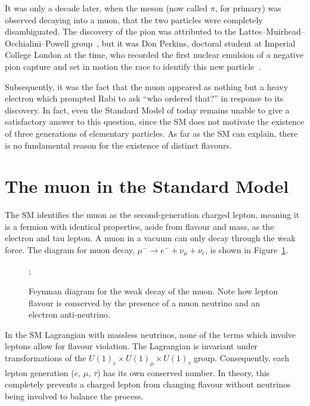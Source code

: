 It was only a decade later, when the meson (now called $\pi$, for primary) was
observed decaying into a muon, that the two particles were completely
disambiguated. The discovery of the pion was attributed to the
Lattes--Muirhead--Occhialini--Powell group~\cite{LATTES1947}, but it was Don
Perkins, doctoral student at Imperial College London at the time, who recorded
the first nuclear emulsion of a negative pion capture and set in motion the race
to identify this new particle~\cite{vieira_carried_2014}.

Subsequently, it was the fact that the muon appeared as nothing but a heavy
electron which prompted Rabi to ask ``who ordered that?'' in response to its
discovery. In fact, even the Standard Model of today remains unable to give a
satisfactory answer to this question, since the SM does not motivate the
existence of three generations of elementary particles. As far as the SM can
explain, there is no fundamental reason for the existence of distinct flavours.

\section{The muon in the Standard Model}

The SM identifies the muon as the second-generation charged lepton, meaning it
is a fermion with identical properties, aside from flavour and mass, as the electron
and tau lepton. A muon in a vacuum can only decay through the weak force. The
diagram for muon decay, $\mu^- \rightarrow e^- +  \nu_\mu + \overline{\nu}_e$,
is shown in Figure~\ref{fig:weak_decay}.

\begin{figure}
    \centering
    ;

    \caption{ Feynman diagram for the weak decay of the muon. Note how lepton
        flavour is conserved by the presence of a muon neutrino and an electron
        anti-neutrino. }
    \label{fig:weak_decay}
\end{figure}

In the SM Lagrangian with massless neutrinos, none of the terms which involve
leptons allow for flavour violation. The Lagrangian is invariant under
transformations of the ${U(1)_e \times U(1)_\mu \times U(1)_\tau}$ group.
Consequently, each lepton generation ($e$, $\mu$, $\tau$) has its own conserved
number. In theory, this completely prevents a charged lepton from changing
flavour without neutrinos being involved to balance the process. 

